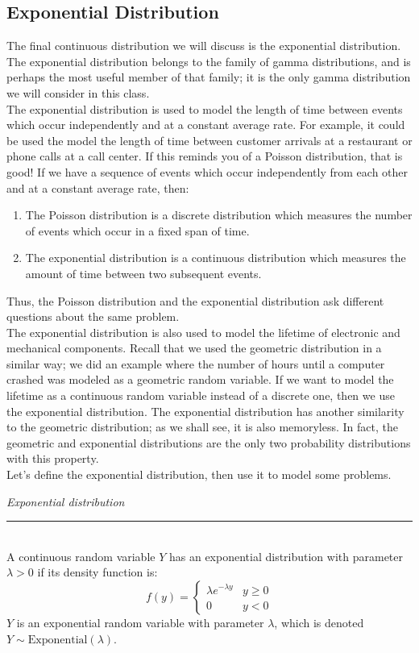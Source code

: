 \documentclass[12pt]{article}
\theoremstyle{definition}
\theoremstyle{remark}
\begin{document}
\subsection{Exponential Distribution}
The final continuous distribution we will discuss is the exponential distribution. The exponential distribution belongs to the family of gamma distributions, and is perhaps the most useful member of that family; it is the only gamma distribution we will consider in this class.\\

The exponential distribution is used to model the length of time between events which occur independently and at a constant average rate. For example, it could be used the model the length of time between customer arrivals at a restaurant or phone calls at a call center. If this reminds you of a Poisson distribution, that is good! If we have a sequence of events which occur independently from each other and at a constant average rate, then:
\begin{enumerate}
\item The Poisson distribution is a discrete distribution which measures the number of events which occur in a fixed span of time.
\item The exponential distribution is a continuous distribution which measures the amount of time between two subsequent events.
\end{enumerate}
Thus, the Poisson distribution and the exponential distribution ask different questions about the same problem.\\

The exponential distribution is also used to model the lifetime of electronic and mechanical components. Recall that we used the geometric distribution in a similar way; we did an example where the number of hours until a computer crashed was modeled as a geometric random variable. If we want to model the lifetime as a continuous random variable instead of a discrete one, then we use the exponential distribution. The exponential distribution has another similarity to the geometric distribution; as we shall see, it is also memoryless. In fact, the geometric and exponential distributions are the only two probability distributions with this property.\\

Let's define the exponential distribution, then use it to model some problems.

\begin{framed}
\emph{Exponential distribution}\\
  \rule{\dimexpr{}\fboxrule}{.1pt} \\
A continuous random variable $Y$ has an exponential distribution with parameter $\lambda > 0$ if its density function is:
\[
f(y) = \begin{cases}
\lambda e^{-\lambda y} & y \geq 0 \\
0 & y < 0
\end{cases}
\]
$Y$ is an exponential random variable with parameter $\lambda$, which is denoted $Y \sim \text{Exponential}(\lambda)$.
\end{framed}
\end{document}
